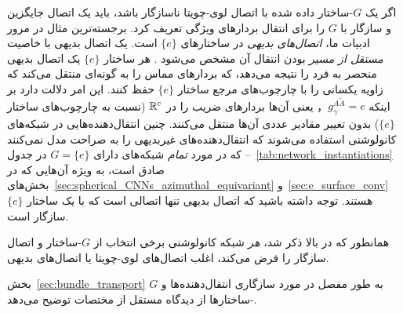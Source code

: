 اگر یک $G$-ساختار داده شده با اتصال لوی-چویتا ناسازگار باشد، باید یک اتصال جایگزین و سازگار با $G$ را برای انتقال بردارهای ویژگی تعریف کرد.
برجسته‌ترین مثال در مرور ادبیات ما، \emph{اتصال‌های بدیهی} در ساختارهای $\{e\}$ است.
یک اتصال بدیهی با خاصیت \emph{مستقل از مسیر} بودن انتقال آن مشخص می‌شود \cite{craneTrivialConnectionsDiscrete2010}.
هر ساختار $\{e\}$ یک اتصال بدیهی منحصر به فرد را نتیجه می‌دهد، که بردارهای مماس را به گونه‌ای منتقل می‌کند که زاویه یکسانی را با چارچوب‌های مرجع ساختار $\{e\}$ حفظ کنند.
این امر دلالت دارد بر اینکه $g_\gamma^{A\widetilde{A}} = e$， یعنی آن‌ها بردارهای ضریب را در $\mathbb{R}^c$ (نسبت به چارچوب‌های ساختار $\{e\}$) بدون تغییر مقادیر عددی آن‌ها منتقل می‌کنند.
چنین انتقال‌دهنده‌هایی در شبکه‌های کانولوشنی استفاده می‌شوند که انتقال‌دهنده‌های غیربدیهی را به صراحت مدل نمی‌کنند -- که در مورد \emph{تمام} شبکه‌های دارای $G=\{e\}$ در جدول~\ref{tab:network_instantiations} صادق است، به ویژه آن‌هایی که در بخش‌های~\ref{sec:spherical_CNNs_azimuthal_equivariant} و~\ref{sec:e_surface_conv} هستند.
توجه داشته باشید که اتصال بدیهی تنها اتصالی است که با یک ساختار $\{e\}$ سازگار است.

همانطور که در بالا ذکر شد، \emph{هر} شبکه کانولوشنی برخی انتخاب از $G$-ساختار و اتصال سازگار را فرض می‌کند،
اغلب اتصال‌های لوی-چویتا یا اتصال‌های بدیهی.

بخش~\ref{sec:bundle_transport} به طور مفصل در مورد سازگاری انتقال‌دهنده‌ها و $G$-ساختارها از دیدگاه مستقل از مختصات توضیح می‌دهد.